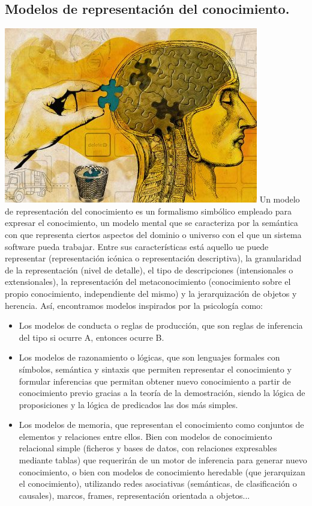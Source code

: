 \documentclass[a4paper, 11pt]{article}
\begin{document}
\subsection{Modelos de representación del conocimiento.}
\includegraphics[width=\textwidth]{representacion.jpg} 
Un modelo de representación del conocimiento es un formalismo simbólico empleado para expresar el conocimiento, un modelo mental que se caracteriza por la semántica con que representa ciertos aspectos del dominio o universo con el que un sistema software pueda trabajar. Entre sus características está aquello ue puede representar (representación icónica o representación descriptiva), la granularidad de la representación (nivel de detalle), el tipo de descripciones (intensionales o extensionales), la representación del metaconocimiento (conocimiento sobre el propio conocimiento, independiente del mismo) y la jerarquización de objetos y herencia. 
Así, encontramos modelos inspirados por la psicología como:
\begin{itemize}
 \item Los modelos de conducta o reglas de producción, que son reglas de inferencia del tipo si ocurre A, entonces ocurre B.
 \item Los modelos de razonamiento o lógicas, que son lenguajes formales con símbolos, semántica y sintaxis que permiten representar el conocimiento y formular inferencias que permitan obtener nuevo conocimiento a partir de conocimiento previo gracias a la teoría de la demostración, siendo la lógica de proposiciones y la lógica de predicados las dos más simples.
 \item Los modelos de memoria, que representan el conocimiento como conjuntos de elementos y relaciones entre ellos. Bien con modelos de conocimiento relacional simple (ficheros y bases de datos, con relaciones expresables mediante tablas) que requerirán de un motor de inferencia para generar nuevo conocimiento, o bien con modelos de conocimiento heredable (que jerarquizan el conocimiento), utilizando redes asociativas (semánticas, de clasificación o causales), marcos, frames, representación orientada a objetos...
 \end{itemize}
\end{document}
